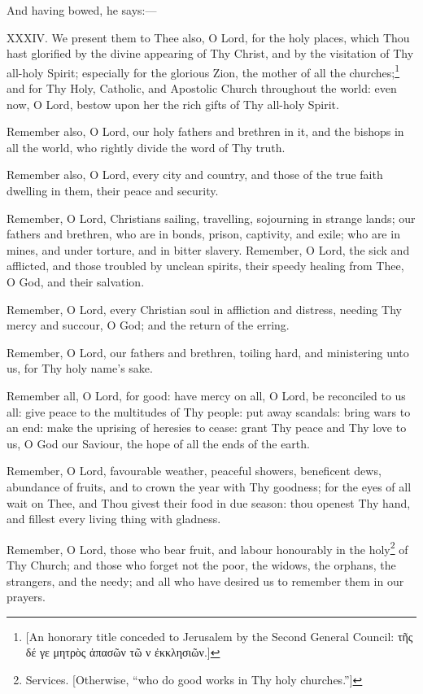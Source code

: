And having bowed, he says:—

XXXIV. We present them to Thee also, O Lord, for the holy places, which Thou hast glorified by the divine appearing of Thy Christ, and by the visitation of Thy all-holy Spirit; especially for the glorious Zion, the mother of all the churches;\footnote{\par{}  [An honorary title conceded to Jerusalem by the Second General Council: \textgreek{τῆς δέ γε μητρὸς} \textgreek{ἁπασῶν τῶ ν ἐκκλησιῶν}.]} and for Thy Holy, Catholic, and Apostolic Church throughout the world: even now, O Lord, bestow upon her the rich gifts of Thy all-holy Spirit.

Remember also, O Lord, our holy fathers and brethren in it, and the bishops in all the world, who rightly divide the word of Thy truth.

Remember also, O Lord, every city and country, and those of the true faith dwelling in them, their peace and security.

Remember, O Lord, Christians sailing, travelling, sojourning in strange lands; our fathers and brethren, who are in bonds, prison, captivity, and exile; who are in mines, and under torture, and in bitter slavery. Remember, O Lord, the sick and afflicted, and those troubled by unclean spirits, their speedy healing from Thee, O God, and their salvation.

Remember, O Lord, every Christian soul in affliction and distress, needing Thy mercy and succour, O God; and the return of the erring.

Remember, O Lord, our fathers and brethren, toiling hard, and ministering unto us, for Thy holy name’s sake.

Remember all, O Lord, for good: have mercy on all, O Lord, be reconciled to us all: give peace to the multitudes of Thy people: put away scandals: bring wars to an end: make the uprising of heresies to cease: grant Thy peace and Thy love to us, O God our Saviour, the hope of all the ends of the earth.

Remember, O Lord, favourable weather, peaceful showers, beneficent dews, abundance of fruits, and to crown the year with Thy goodness; for the eyes of all wait on Thee, and Thou givest their food in due season: thou openest Thy hand, and fillest every living thing with gladness.

Remember, O Lord, those who bear fruit, and labour honourably in the holy\footnote{\par  Services. [Otherwise, “who do good works in Thy holy churches.”]} of Thy Church; and those who forget not the poor, the widows, the orphans, the strangers, and the needy; and all who have desired us to remember them in our prayers.

